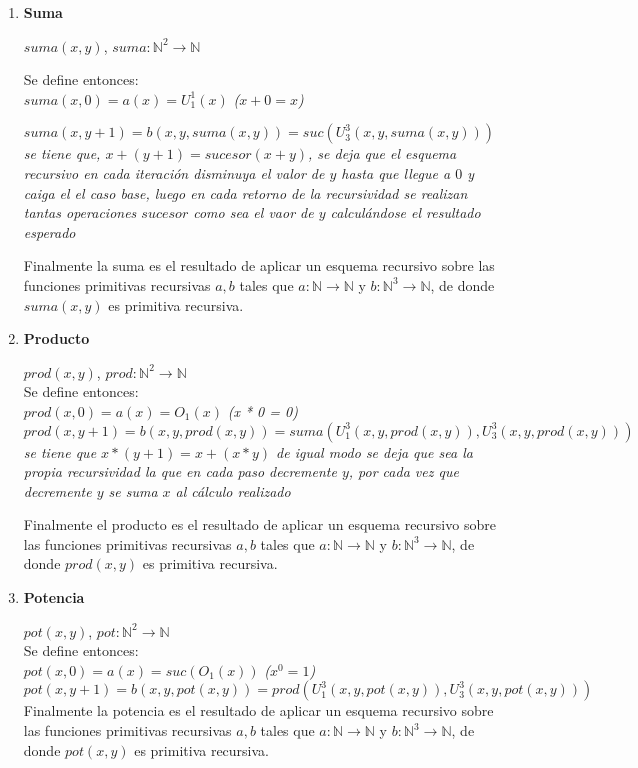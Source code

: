 \documentclass[a4paper,1pt]{report}
\begin{document}
\begin{enumerate}
 \item \textbf{Suma}
 
 $suma(x,y)$, $suma:\mathbb{N}^2\rightarrow\mathbb{N}$
 
 Se define entonces:\\
 
  $suma(x,0)=a(x)=U^1_1(x)$ \textit{($x+0 = x$)}

  $suma(x,y+1)=b(x,y,suma(x,y))=suc(U^3_3(x,y,suma(x,y)))$\\ 
  
  \textit{se tiene que, $x + (y +1) = sucesor(x+y)$, se deja que el esquema recursivo en cada iteraci\'on disminuya el valor de $y$ hasta que llegue a $0$ y caiga el el caso base, luego en cada retorno de la recursividad se realizan tantas operaciones $sucesor$ como sea el vaor de $y$ calcul\'andose el resultado esperado}
 
  Finalmente la suma es el resultado de aplicar un esquema recursivo sobre las funciones primitivas recursivas $a,b$ tales que $a:\mathbb{N}\rightarrow\mathbb{N}$ y $b:\mathbb{N}^3\rightarrow\mathbb{N}$, de donde $suma(x,y)$ es primitiva recursiva.
 
 
 
 \item \textbf{Producto}
 
 $prod(x,y)$, $prod:\mathbb{N}^2\rightarrow\mathbb{N}$\\
 Se define entonces: \\
 
 $prod(x,0)=a(x)=O_1(x)$ \textit{(x * 0 = 0)}\\
 $prod(x,y+1)=b(x,y,prod(x,y))=suma(U^3_1(x,y,prod(x,y)),U^3_3(x,y,prod(x,y)))$\\
 
 \textit{se tiene que $x * (y +1) = x + (x * y)$ de igual modo se deja que sea la propia recursividad la que en cada paso decremente $y$, por cada vez que decremente $y$ se suma $x$ al c\'alculo realizado}


  Finalmente el producto es el resultado de aplicar un esquema recursivo sobre las funciones primitivas recursivas $a,b$ tales que $a:\mathbb{N}\rightarrow\mathbb{N}$ y $b:\mathbb{N}^3\rightarrow\mathbb{N}$, de donde $prod(x,y)$ es primitiva recursiva.
 
 
 
 \item \textbf{Potencia}
 
 $pot(x,y)$, $pot:\mathbb{N}^2\rightarrow\mathbb{N}$\\
 Se define entonces:\\

 $pot(x,0)=a(x)=suc(O_1(x))$  \textit{($x^0 =1$)}\\
 $pot(x,y+1)=b(x,y,pot(x,y))=prod(U^3_1(x,y,pot(x,y)),U^3_3(x,y,pot(x,y)))$ \\
 
  Finalmente la potencia es el resultado de aplicar un esquema recursivo sobre las funciones primitivas recursivas $a,b$ tales que $a:\mathbb{N}\rightarrow\mathbb{N}$ y $b:\mathbb{N}^3\rightarrow\mathbb{N}$, de donde $pot(x,y)$ es primitiva recursiva.
 
\end{enumerate}
\end{document}
